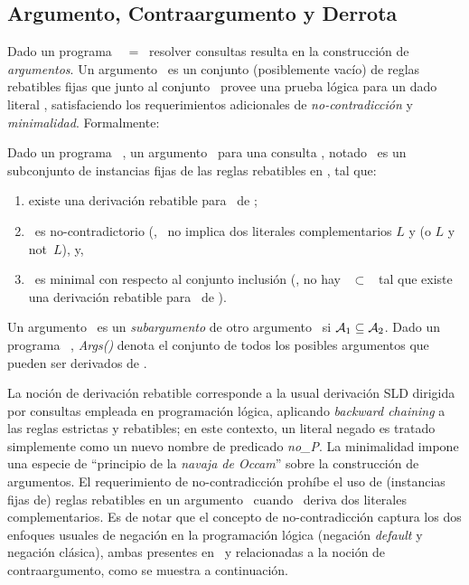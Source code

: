 \subsection{Argumento, Contraargumento y Derrota}

Dado un programa \DLP\ \PP\ = \SD\, resolver consultas resulta en la construcción de \textit{argumentos}.
Un argumento \ArgA\ es un conjunto (posiblemente vacío) de reglas rebatibles fijas que junto al conjunto \SSet\ 
provee una prueba lógica para un dado literal \ArgQ, satisfaciendo los requerimientos adicionales de 
\textit{no-contradicción} y \textit{minimalidad}. Formalmente:

\begin{definicion}[Argumento]
	Dado un programa \DLP\ \PP, un argumento \ArgA\ para una consulta \ArgQ, notado \AQ\, es un subconjunto de 
	instancias fijas de las reglas rebatibles en \PP, tal que:
	
	\begin{enumerate}[(1)]
		\item existe una derivación rebatible para \ArgQ\ de \SyA;
		\item \SyA\ es no-contradictorio (\ie, \SyA\ no implica dos literales complementarios $L$ y 
		(o $L$ y \textsf{not}\ $L$), y,		
		\item \ArgA\ es minimal con respecto al conjunto inclusión (\ie, no hay \Ap\ $\subset$ \ArgA\ tal que
		existe una derivación rebatible para \ArgQ\ de \SyAp).
	\end{enumerate}
	
\end{definicion}

Un argumento \AaQa\ es un \textit{subargumento} de otro argumento \AbQb\ si $\mbox{${\mathcal A_1}$} \subseteq \mbox{${\mathcal A_2}$}$.
Dado un programa \DLP\ \PP, \textit{Args(\PP)} denota el conjunto de todos los posibles argumentos que 
pueden ser derivados de \PP.

La noción de derivación rebatible corresponde a la usual derivación SLD dirigida por consultas
empleada en programación lógica, aplicando \textit{backward chaining} a las reglas estrictas y rebatibles;
en este contexto, un literal negado \lit{\no P} es tratado simplemente como un nuevo nombre de predicado \textit{no\_P}. La minimalidad impone una especie de ``principio de la \textit{navaja de Occam}'' sobre la construcción 
de argumentos. El requerimiento de no-contradicción prohíbe el uso de (instancias fijas de) reglas rebatibles
en un argumento \ArgA\ cuando \SyA\ deriva dos literales complementarios. Es de notar que el concepto de no-contradicción captura los dos enfoques usuales de negación en la programación lógica (negación \textit{default}
y negación clásica), ambas presentes en \DLP\ y relacionadas a la noción de contraargumento, como se muestra a continuación.

